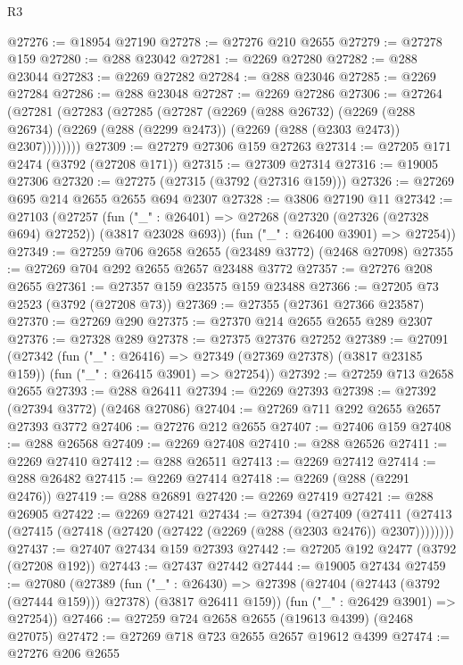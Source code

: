 \begin{lexlean}{R3}
\begin{coremodule}
@27276 := @18954 @27190
@27278 := @27276 @210 @2655
@27279 := @27278 @159
@27280 := @288 @23042
@27281 := @2269 @27280
@27282 := @288 @23044
@27283 := @2269 @27282
@27284 := @288 @23046
@27285 := @2269 @27284
@27286 := @288 @23048
@27287 := @2269 @27286
@27306 := @27264
    (@27281
      (@27283
        (@27285
          (@27287
            (@2269
              (@288 @26732)
              (@2269
                (@288 @26734)
                (@2269 (@288 (@2299 @2473)) (@2269 (@288 (@2303 @2473)) @2307))))))))
@27309 := @27279 @27306 @159 @27263
@27314 := @27205 @171 @2474 (@3792 (@27208 @171))
@27315 := @27309 @27314
@27316 := @19005 @27306
@27320 := @27275 (@27315 (@3792 (@27316 @159)))
@27326 := @27269 @695 @214 @2655 @2655 @694 @2307
@27328 := @3806 @27190 @11
@27342 := @27103
    (@27257
      (fun ("_" : @26401) => @27268 (@27320 (@27326 (@27328 @694) @27252)) (@3817 @23028 @693))
      (fun ("_" : @26400 @3901) => @27254))
@27349 := @27259 @706 @2658 @2655 (@23489 @3772) (@2468 @27098)
@27355 := @27269 @704 @292 @2655 @2657 @23488 @3772
@27357 := @27276 @208 @2655
@27361 := @27357 @159 @23575 @159 @23488
@27366 := @27205 @73 @2523 (@3792 (@27208 @73))
@27369 := @27355 (@27361 @27366 @23587)
@27370 := @27269 @290
@27375 := @27370 @214 @2655 @2655 @289 @2307
@27376 := @27328 @289
@27378 := @27375 @27376 @27252
@27389 := @27091
    (@27342
      (fun ("_" : @26416) => @27349 (@27369 @27378) (@3817 @23185 @159))
      (fun ("_" : @26415 @3901) => @27254))
@27392 := @27259 @713 @2658 @2655
@27393 := @288 @26411
@27394 := @2269 @27393
@27398 := @27392 (@27394 @3772) (@2468 @27086)
@27404 := @27269 @711 @292 @2655 @2657 @27393 @3772
@27406 := @27276 @212 @2655
@27407 := @27406 @159
@27408 := @288 @26568
@27409 := @2269 @27408
@27410 := @288 @26526
@27411 := @2269 @27410
@27412 := @288 @26511
@27413 := @2269 @27412
@27414 := @288 @26482
@27415 := @2269 @27414
@27418 := @2269 (@288 (@2291 @2476))
@27419 := @288 @26891
@27420 := @2269 @27419
@27421 := @288 @26905
@27422 := @2269 @27421
@27434 := @27394
    (@27409
      (@27411 (@27413 (@27415 (@27418 (@27420 (@27422 (@2269 (@288 (@2303 @2476)) @2307))))))))
@27437 := @27407 @27434 @159 @27393
@27442 := @27205 @192 @2477 (@3792 (@27208 @192))
@27443 := @27437 @27442
@27444 := @19005 @27434
@27459 := @27080
    (@27389
      (fun ("_" : @26430) =>
      @27398 (@27404 (@27443 (@3792 (@27444 @159))) @27378) (@3817 @26411 @159))
      (fun ("_" : @26429 @3901) => @27254))
@27466 := @27259 @724 @2658 @2655 (@19613 @4399) (@2468 @27075)
@27472 := @27269 @718 @723 @2655 @2657 @19612 @4399
@27474 := @27276 @206 @2655

\end{coremodule}
\end{lexlean}
